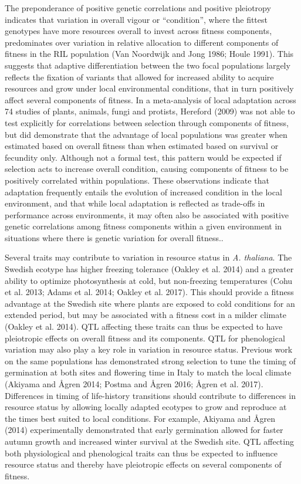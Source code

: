 \documentclass[]{article}
\begin{document}
The preponderance of positive genetic correlations and positive pleiotropy indicates that variation in overall vigour or ``condition'', where the fittest genotypes have more resources overall to invest across fitness components, predominates over variation in relative allocation to different components of fitness in the RIL population (Van Noordwijk and Jong 1986; Houle 1991). This suggests that adaptive differentiation between the two focal populations largely reflects the fixation of variants that allowed for increased ability to acquire resources and grow under local environmental conditions, that in turn positively affect several components of fitness.
In a meta-analysis of local adaptation across 74 studies of plants, animals, fungi and protists, Hereford (2009) was not able to test explicitly for correlations between selection through components of fitness, but did demonstrate that the advantage of local populations was greater when estimated based on overall fitness than when estimated based on survival or fecundity only.
Although not a formal test, this pattern would be expected if selection acts to increase overall condition, causing components of fitness to be positively correlated within populations.
These observations indicate that adaptation frequently entails the evolution of increased condition in the local environment, and that while local adaptation is reflected as trade-offs in performance across environments, it may often also be associated with positive genetic correlations among fitness components within a given environment in situations where there is genetic variation for overall fitness..

Several traits may contribute to variation in resource status in \emph{A. thaliana}. The Swedish ecotype has higher freezing tolerance (Oakley et al. 2014) and a greater ability to optimize photosynthesis at cold, but non-freezing temperatures (Cohu et al. 2013; Adams et al. 2014; Oakley et al. 2017). This should provide a fitness advantage at the Swedish site where plants are exposed to cold conditions for an extended period, but may be associated with a fitness cost in a milder climate (Oakley et al. 2014). QTL affecting these traits can thus be expected to have pleiotropic effects on overall fitness and its components. QTL for phenological variation may also play a key role in variation in resource status. Previous work on the same populations has demonstrated strong selection to tune the timing of germination at both sites and flowering time in Italy to match the local climate (Akiyama and Ågren 2014; Postma and Ågren 2016; Ågren et al. 2017). Differences in timing of life-history transitions should contribute to differences in resource status by allowing locally adapted ecotypes to grow and reproduce at the times best suited to local conditions. For example, Akiyama and Ågren (2014) experimentally demonstrated that early germination allowed for faster autumn growth and increased winter survival at the Swedish site. QTL affecting both physiological and phenological traits can thus be expected to influence resource status and thereby have pleiotropic effects on several components of fitness.
\end{document}
